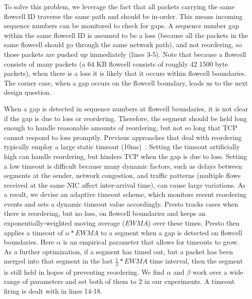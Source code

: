 To solve this problem, we leverage the fact that all packets carrying the same flowcell ID traverse the 
same path and should be in-order.
This means incoming sequence numbers can be monitored to check for
gaps. A sequence number gap within the same flowcell ID is assumed to be a loss (because all the
packets in the same flowcell should go through the same network path), and not reordering,
so those packets are pushed up immediately (lines 3-5).
Note that because a flowcell consists of many packets (a 64 KB flowcell consists
of roughly 42 1500 byte packets), when there is a loss it is likely that it occurs within flowcell boundaries. 
The corner case, when a gap occurs on the flowcell boundary, leads us to the next design question.

When a gap is detected in sequence numbers at flowcell boundaries, it is not clear if the gap is due
to loss or reordering. Therefore, the segment should be held long enough to
handle reasonable amounts of reordering, but not so long that TCP cannot respond
to loss promptly. Previous approaches that deal with reordering typically employ a large static
timeout (10ms)~\cite{drb}. 
Setting the timeout artificially high can handle reordering, but hinders TCP when the gap is
due to loss. 
Setting a low timeout is difficult because many dynamic factors, such as delays between
segments at the sender, network congestion, and traffic patterns (multiple flows 
received at the same NIC affect inter-arrival time), can cause large variations.
As a result, we devise an adaptive timeout scheme, which monitors recent reordering events and sets a dynamic timeout value accordingly.
Presto tracks cases when there is reordering, but no loss, on flowcell boundaries and keeps an exponentially-weighted
moving average ($EWMA$) over these times. Presto then applies a timeout of $\alpha * EWMA$ to a segment when a gap is 
detected on flowcell boundaries. 
Here $\alpha$ is an empirical parameter that allows for timeouts to grow. As a further optimization, if a segment
has timed out, but a packet has been merged into that segment in the last $\frac{1}{\beta} * EWMA$ time interval, then 
the segment is still held in hopes of preventing reordering. We find $\alpha$ and $\beta$
work over a wide range of parameters and set both of them to 2 in our experiments. A timeout firing is dealt with in lines 14-18.


